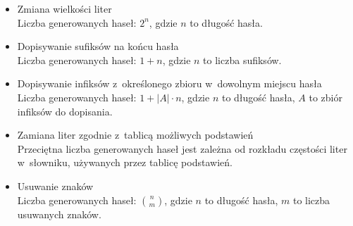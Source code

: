 \begin{itemize}

    \item
        Zmiana wielkości liter \\
        Liczba generowanych haseł: $2^n$, gdzie $n$ to długość hasła.
        

        

    \item
        Dopisywanie sufiksów na końcu hasła \\
        Liczba generowanych haseł: $1+n$, gdzie $n$ to liczba sufiksów.

        

        

    \item
        Dopisywanie infiksów z~określonego zbioru w~dowolnym miejscu hasła \\
        Liczba generowanych haseł: $1 + |A| \cdot n$, gdzie $n$ to długość
        hasła, $A$ to zbiór infiksów do dopisania.

        

        

    \item
        Zamiana liter zgodnie z~tablicą możliwych podstawień \\
        Przeciętna liczba generowanych haseł jest zależna od rozkładu częstości
        liter w~słowniku, używanych przez tablicę podstawień.

        

        

    \item
        Usuwanie znaków \\
        Liczba generowanych haseł: $n \choose m$, gdzie $n$ to długość hasła,
        $m$ to liczba usuwanych znaków.


\end{itemize}
